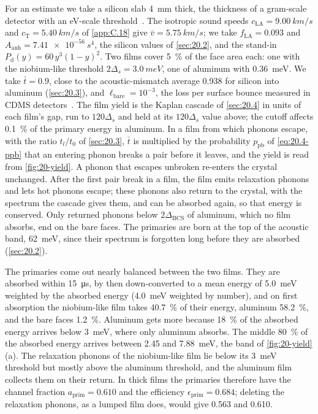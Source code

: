 For an estimate we take a silicon slab \SI{4}{mm} thick, the thickness of a gram-scale detector with an eV-scale threshold~\cite[Sect.~IV]{ren2021design}. The isotropic sound speeds $c_{\mathrm{LA}} = \SI{9.00}{km/s}$ and $c_{\mathrm{T}} = \SI{5.40}{km/s}$ of \cref{app:C.18} give $\bar v = \SI{5.75}{km/s}$; we take $f_{\mathrm{LA}} = 0.093$ and $A_{\mathrm{anh}} = \SI{7.41e-56}{s^4}$, the silicon values of \cref{sec:20.2}, and the stand-in $P_{\mathrm{d}}(y) = 60\,y^3(1 - y)^2$. Two films cover \SI{5}{\percent} of the face area each: one with the niobium-like threshold $2\Delta_s = \SI{3.0}{meV}$, one of aluminum with \SI{0.36}{meV}. We take $\bar t = 0.9$, close to the acoustic-mismatch average 0.938 for silicon into aluminum (\cref{sec:20.3}), and $\ell_{\mathrm{bare}} = 10^{-3}$, the loss per surface bounce measured in CDMS detectors~\cite[Sect.~III\,G]{leman2012invited}. The film yield is the Kaplan cascade of \cref{sec:20.4} in units of each film's gap, run to $120\Delta_s$ and held at its $120\Delta_s$ value above; the cutoff affects \SI{0.1}{\percent} of the primary energy in aluminum. In a film from which phonons escape, with the ratio $t_l/t_0$ of \cref{sec:20.3}, $\bar t$ is multiplied by the probability $p_{\mathrm{pb}}$ of \cref{eq:20.4-ppb} that an entering phonon breaks a pair before it leaves, and the yield is read from \cref{fig:20-yield}. A phonon that escapes unbroken re-enters the crystal unchanged. After the first pair break in a film, the film emits relaxation phonons and lets hot phonons escape; these phonons also return to the crystal, with the spectrum the cascade gives them, and can be absorbed again, so that energy is conserved. Only returned phonons below $2\Delta_{\mathrm{BCS}}$ of aluminum, which no film absorbs, end on the bare faces. The primaries are born at the top of the acoustic band, \SI{62}{meV}, since their spectrum is forgotten long before they are absorbed (\cref{sec:20.2}).

The primaries come out nearly balanced between the two films. They are absorbed within \SI{15}{\micro s}, by then down-converted to a mean energy of \SI{5.0}{meV} weighted by the absorbed energy (\SI{4.0}{meV} weighted by number), and on first absorption the niobium-like film takes \SI{40.7}{\percent} of their energy, aluminum \SI{58.2}{\percent}, and the bare faces \SI{1.2}{\percent}. Aluminum gets more because \SI{18}{\percent} of the absorbed energy arrives below \SI{3}{meV}, where only aluminum absorbs. The middle \SI{80}{\percent} of the absorbed energy arrives between 2.45 and \SI{7.88}{meV}, the band of \cref{fig:20-yield}(a). The relaxation phonons of the niobium-like film lie below its \SI{3}{meV} threshold but mostly above the aluminum threshold, and the aluminum film collects them on their return. In thick films the primaries therefore have the channel fraction $a_{\mathrm{prim}} = 0.610$ and the efficiency $\epsilon_{\mathrm{prim}} = 0.684$; deleting the relaxation phonons, as a lumped film does, would give 0.563 and 0.610.

